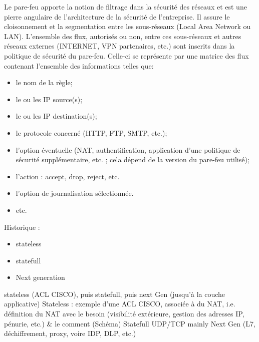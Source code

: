 Le pare-feu apporte la notion de filtrage dans la sécurité des réseaux et est une pierre angulaire de l'architecture de la sécurité de l'entreprise.
Il assure le cloisonnement et la segmentation entre les sous-réseaux (Local Area Network ou LAN).
L'ensemble des flux, autorisés ou non, entre ces sous-réseaux et autres réseaux externes (INTERNET, VPN partenaires, etc.) sont inscrits dans la politique de sécurité du pare-feu.
Celle-ci se représente par une matrice des flux contenant l'ensemble des informations telles que:
\begin{itemize}
    \item le nom de la règle;
    \item le ou les IP source(s);
    \item le ou les IP destination(s);
    \item le protocole concerné (HTTP, FTP, SMTP, etc.);
    \item l'option éventuelle (NAT, authentification, application d'une politique de sécurité supplémentaire, etc. ; cela dépend de la version du pare-feu utilisé);
    \item l'action : accept, drop, reject, etc.
    \item l'option de journalisation sélectionnée.
    \item etc.
\end{itemize}

Historique : 
\begin{itemize}
    \item stateless
    \item statefull
    \item Next generation
\end{itemize}

stateless (ACL CISCO), puis statefull, puis next Gen (jusqu’à la couche applicative)
Stateless : exemple d’une ACL CISCO, associée à du NAT, i.e. définition du NAT avec le besoin (visibilité extérieure, gestion des adresses IP, pénurie, etc.) \& le comment (Schéma)
Statefull UDP/TCP mainly
Next Gen (L7, déchiffrement, proxy, voire IDP, DLP, etc.)


